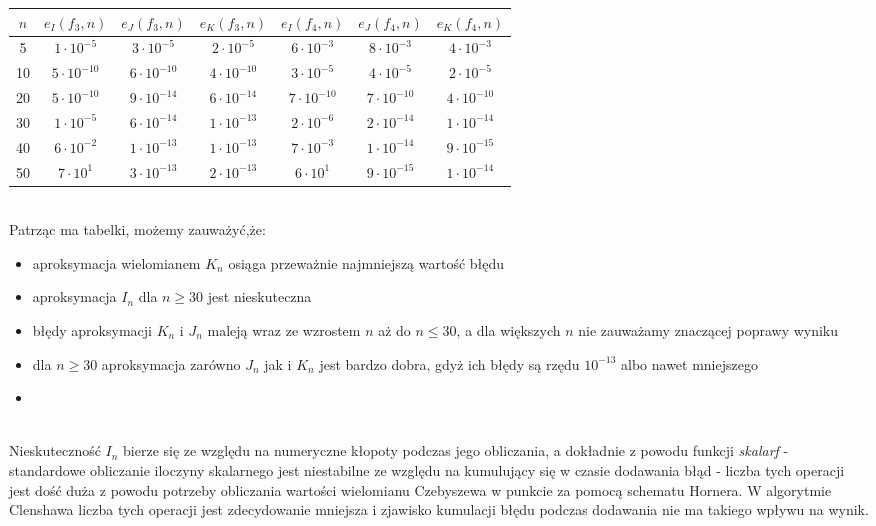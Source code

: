 \documentclass[12pt,wide]{mwart}
\begin{document}
\begin{tabular}{|c|c|c|c|c|c|c|}
\hline 
$n$ & $e_I(f_3,n)$ & $e_J(f_3,n)$ & $e_K(f_3,n)$ & $e_I(f_4,n)$ & $e_J(f_4,n)$ & $e_K(f_4,n)$ \\ 
\hline 
5 & $1\cdot 10^{-5}$ & $3\cdot 10^{-5}$ & $2\cdot 10^{-5}$ & $6\cdot 10^{-3}$ & $8\cdot 10^{-3}$ & $4\cdot 10^{-3}$ \\ 
\hline 
10 & $5\cdot 10^{-10}$ & $6\cdot 10^{-10}$ & $4\cdot 10^{-10}$ & $3\cdot 10^{-5}$ & $4\cdot 10^{-5}$ & $2\cdot 10^{-5}$ \\ 
\hline 
20 & $5\cdot 10^{-10}$ & $9\cdot 10^{-14}$ & $6\cdot 10^{-14}$ & $7\cdot 10^{-10}$ & $7\cdot 10^{-10}$ & $4\cdot 10^{-10}$ \\ 
\hline
30 & $1\cdot 10^{-5}$ & $6\cdot 10^{-14}$ & $1\cdot 10^{-13}$ & $2\cdot 10^{-6}$ & $2\cdot 10^{-14}$ & $1\cdot 10^{-14}$ \\ 
\hline
40 & $6\cdot 10^{-2}$ & $1\cdot 10^{-13}$ & $1\cdot 10^{-13}$ & $7\cdot 10^{-3}$ & $1\cdot 10^{-14}$ & $9\cdot 10^{-15}$ \\ 
\hline 
50 & $7\cdot 10^{1}$ & $3\cdot 10^{-13}$ & $2\cdot 10^{-13}$ & $6\cdot 10^{1}$ & $9\cdot 10^{-15}$ & $1\cdot 10^{-14}$ \\ 
\hline 

\end{tabular}\\

Patrząc ma tabelki, możemy zauważyć,że:
\begin{itemize}
\item aproksymacja wielomianem $K_n$ osiąga przeważnie najmniejszą wartość błędu
\item aproksymacja $I_n$ dla $ n \geq 30$ jest nieskuteczna
\item błędy aproksymacji $K_n$ i $J_n$ maleją wraz ze wzrostem $n$ aż do $n \leq 30$, a dla większych $n$ nie zauważamy znaczącej poprawy wyniku
\item dla $n \geq 30$ aproksymacja zarówno $J_n$ jak i $K_n$ jest bardzo dobra, gdyż ich błędy są rzędu $10^{-13}$ albo nawet mniejszego
\item 
\end{itemize}\\

Nieskuteczność $I_n$ bierze się ze względu na numeryczne kłopoty podczas jego obliczania, a dokładnie z powodu funkcji \textit{skalarf} - standardowe obliczanie iloczyny skalarnego jest niestabilne ze względu na kumulujący się w czasie dodawania błąd - liczba tych operacji jest dość duża z powodu potrzeby obliczania wartości wielomianu Czebyszewa w punkcie za pomocą schematu Hornera. W algorytmie Clenshawa liczba tych operacji jest zdecydowanie mniejsza i zjawisko kumulacji błędu podczas dodawania nie ma takiego wpływu na wynik.  
 
\end{document}
